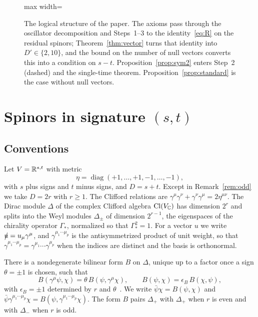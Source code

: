 \begin{figure}[t]
\begin{adjustbox}{max width=\linewidth}
\end{adjustbox}
\caption{The logical structure of the paper. The axioms pass through the oscillator decomposition and Steps~1--3 to the identity~\eqref{eq:R} on the residual spinors; Theorem~\ref{thm:vector} turns that identity into $D'\in\{2,10\}$, and the bound on the number of null vectors converts this into a condition on $s-t$. Proposition~\ref{prop:sym2} enters Step~2 (dashed) and the single-time theorem. Proposition~\ref{prop:standard} is the case without null vectors.}
\label{fig:proofmap}
\end{figure}

\section{Spinors in signature \texorpdfstring{$(s,t)$}{(s,t)}}
\label{sec:spinors}

\subsection{Conventions}

Let $V=\mathbb{R}^{s,t}$ with metric
\[
\eta=\operatorname{diag}(+1,\dots,+1,-1,\dots,-1),
\]
with $s$ plus signs and $t$ minus signs, and $D=s+t$. Except in Remark~\ref{rem:odd} we take $D=2r$ with $r\ge1$. The Clifford relations are $\gamma^\mu\gamma^\nu+\gamma^\nu\gamma^\mu=2\eta^{\mu\nu}$. The Dirac module $\Delta$ of the complex Clifford algebra $\operatorname{Cl}(V_{\mathbb{C}})$ has dimension $2^r$ and splits into the Weyl modules $\Delta_\pm$ of dimension $2^{r-1}$, the eigenspaces of the chirality operator $\Gamma_*$, normalized so that $\Gamma_*^2=1$. For a vector $u$ we write $\slashed{u}=u_\mu\gamma^\mu$, and $\gamma^{\mu_1\cdots\mu_p}$ is the antisymmetrized product of unit weight, so that $\gamma^{\mu_1\cdots\mu_p}=\allowbreak\gamma^{\mu_1}\cdots\gamma^{\mu_p}$ when the indices are distinct and the basis is orthonormal.

There is a nondegenerate bilinear form $B$ on $\Delta$, unique up to a factor once a sign $\theta=\pm1$ is chosen, such that
\begin{equation}
\label{eq:Bsym}
B(\gamma^\mu\psi,\chi)=\theta\,B(\psi,\gamma^\mu\chi),\qquad B(\psi,\chi)=\epsilon_B\,B(\chi,\psi),
\end{equation}
with $\epsilon_B=\pm1$ determined by $r$ and $\theta$~\cite{Deligne1999,VanProeyen1999,DAuriaFerraraLledoVaradarajan2001}. We write $\bar\psi\chi=B(\psi,\chi)$ and $\bar\psi\gamma^{\mu_1\cdots\mu_p}\chi=B(\psi,\gamma^{\mu_1\cdots\mu_p}\chi)$. The form $B$ pairs $\Delta_+$ with $\Delta_+$ when $r$ is even and with $\Delta_-$ when $r$ is odd.

